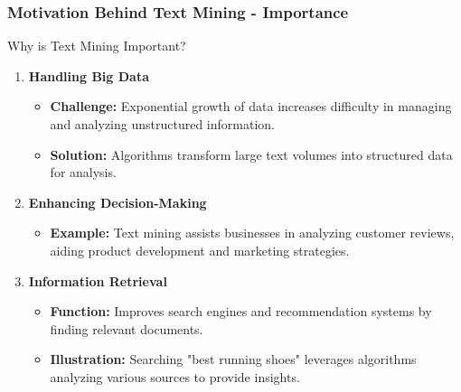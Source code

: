 \documentclass[aspectratio=169]{beamer}
\begin{document}
\begin{frame}[fragile]
    \frametitle{Motivation Behind Text Mining - Importance}
    \begin{block}{Why is Text Mining Important?}
        \begin{enumerate}
            \item \textbf{Handling Big Data}
                \begin{itemize}
                    \item \textbf{Challenge:} Exponential growth of data increases difficulty in managing and analyzing unstructured information.
                    \item \textbf{Solution:} Algorithms transform large text volumes into structured data for analysis.
                \end{itemize}
                
            \item \textbf{Enhancing Decision-Making}
                \begin{itemize}
                    \item \textbf{Example:} Text mining assists businesses in analyzing customer reviews, aiding product development and marketing strategies.
                \end{itemize}
                
            \item \textbf{Information Retrieval}
                \begin{itemize}
                    \item \textbf{Function:} Improves search engines and recommendation systems by finding relevant documents.
                    \item \textbf{Illustration:} Searching "best running shoes" leverages algorithms analyzing various sources to provide insights.
                \end{itemize}
        \end{enumerate}
    \end{block}
\end{frame}
\end{document}
